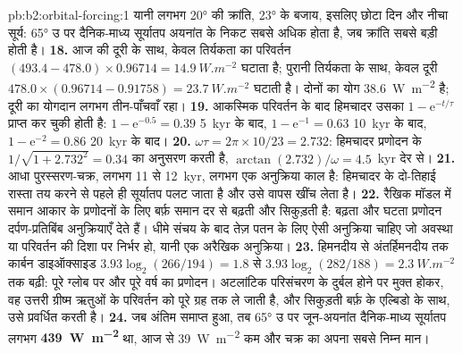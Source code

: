 \begin{solution}{pb:b2:orbital-forcing:1}
यानी लगभग \ang{20} की क्रांति, \ang{23} के बजाय, इसलिए छोटा दिन और नीचा सूर्य: \ang{65} उ पर
दैनिक-माध्य सूर्यातप अयनांत के निकट सबसे अधिक होता है, जब क्रांति सबसे बड़ी होती है।
\textbf{18.} आज की दूरी के साथ, केवल तिर्यकता का परिवर्तन $(493.4 - 478.0) \times
0.96714 = \qty{14.9}{W.m^{-2}}$ घटाता है; पुरानी तिर्यकता के साथ, केवल दूरी $478.0 \times
(0.96714 - 0.91758) = \qty{23.7}{W.m^{-2}}$ घटाती है। दोनों का योग \qty{38.6}{W.m^{-2}} है; दूरी का
योगदान लगभग तीन-पाँचवाँ रहा।
\textbf{19.} आकस्मिक परिवर्तन के बाद हिमचादर उसका $1 - \mathrm e^{-t/\tau}$ प्राप्त कर चुकी होती है:
$1 - \mathrm e^{-0.5} = 0.39$ \qty{5}{kyr} के बाद, $1 - \mathrm e^{-1} = 0.63$ \qty{10}{kyr} के बाद,
$1 - \mathrm e^{-2} = 0.86$ \qty{20}{kyr} के बाद।
\textbf{20.} $\omega\tau = 2\pi \times 10/23 = 2.732$: हिमचादर प्रणोदन के $1/\sqrt{1 + 2.732^2} =
0.34$ का अनुसरण करती है, $\arctan(2.732)/\omega = 4.5$~\unit{kyr} देर से।
\textbf{21.} आधा पुरस्सरण-चक्र, लगभग 11 से \qty{12}{kyr}, लगभग एक अनुक्रिया काल है: हिमचादर के
दो-तिहाई रास्ता तय करने से पहले ही सूर्यातप पलट जाता है और उसे वापस खींच लेता है।
\textbf{22.} रैखिक मॉडल में समान आकार के प्रणोदनों के लिए बर्फ़ समान दर से बढ़ती और सिकुड़ती है:
बढ़ता और घटता प्रणोदन दर्पण-प्रतिबिंब अनुक्रियाएँ देते हैं। धीमे संचय के बाद तेज़
पतन के लिए ऐसी अनुक्रिया चाहिए जो अवस्था या परिवर्तन की दिशा पर निर्भर हो, यानी
एक अरैखिक अनुक्रिया।
\textbf{23.} हिमनदीय से अंतर्हिमनदीय तक कार्बन डाइऑक्साइड $3.93\log_2(266/194) = 1.8$ से $3.93\log_2(282/188) =
\qty{2.3}{W.m^{-2}}$ तक बढ़ी: पूरे ग्लोब पर और पूरे
वर्ष का प्रणोदन। अटलांटिक परिसंचरण के दुर्बल होने पर मुक्त होकर, वह उत्तरी
ग्रीष्म ऋतुओं के परिवर्तन को पूरे ग्रह तक ले जाती है, और सिकुड़ती बर्फ़ के एल्बिडो के साथ, उसे प्रवर्धित करती है।
\textbf{24.} जब अंतिम  समाप्त हुआ, तब \ang{65} उ पर जून-अयनांत दैनिक-माध्य सूर्यातप
लगभग \textbf{\qty{439}{W.m^{-2}}} था, आज से \qty{39}{W.m^{-2}} कम और चक्र का अपना सबसे निम्न
मान।
\end{solution}
